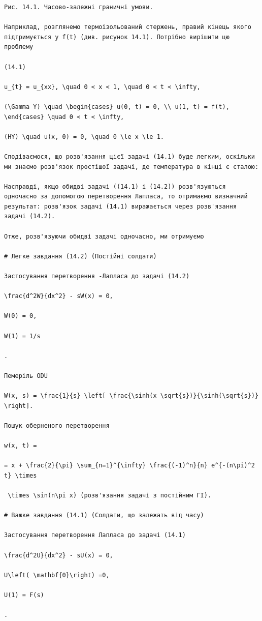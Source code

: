 \documentclass[
  ukrainian,
]{article}
\begin{document}
\begin{verbatim}
Рис. 14.1. Часово-залежні граничні умови.

Наприклад, розглянемо термоізольований стержень, правий кінець якого підтримується у f(t) (див. рисунок 14.1). Потрібно вирішити цю проблему

(14.1)

u_{t} = u_{xx}, \quad 0 < x < 1, \quad 0 < t < \infty,

(\Gamma Y) \quad \begin{cases} u(0, t) = 0, \\ u(1, t) = f(t), \end{cases} \quad 0 < t < \infty,

(HY) \quad u(x, 0) = 0, \quad 0 \le x \le 1.

Сподіваємося, що розв'язання цієї задачі (14.1) буде легким, оскільки ми знаємо розв'язок простішої задачі, де температура в кінці є сталою:

Насправді, якщо обидві задачі ((14.1) і (14.2)) розв'язуються одночасно за допомогою перетворення Лапласа, то отримаємо визначний результат: розв'язок задачі (14.1) виражається через розв'язання задачі (14.2).

Отже, розв'язуючи обидві задачі одночасно, ми отримуємо

# Легке завдання (14.2) (Постійні солдати)

Застосування перетворення -Лапласа до задачі (14.2)

\frac{d^2W}{dx^2} - sW(x) = 0,

W(0) = 0,

W(1) = 1/s

.

Пемеріль ODU

W(x, s) = \frac{1}{s} \left[ \frac{\sinh(x \sqrt{s})}{\sinh(\sqrt{s})} \right].

Пошук оберненого перетворення

w(x, t) =

= x + \frac{2}{\pi} \sum_{n=1}^{\infty} \frac{(-1)^n}{n} e^{-(n\pi)^2 t} \times

 \times \sin(n\pi x) (розв'язання задачі з постійним ГІ).

# Важке завдання (14.1) (Солдати, що залежать від часу)

Застосування перетворення Лапласа до задачі (14.1)

\frac{d^2U}{dx^2} - sU(x) = 0,

U\left( \mathbf{0}\right) =0,

U(1) = F(s)

.


\end{verbatim}
\end{document}
